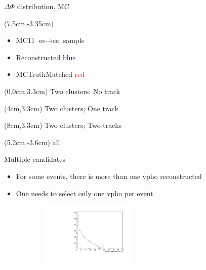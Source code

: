 \documentclass[10pt]{beamer}
\begin{document}
{\begin{frame}{$\Delta \Phi$ distribution, MC}
\begin{textblock*}{\textwidth}
\end{textblock*}	

\begin{textblock*}{\textwidth}(7.5cm,-3.35cm)
	\begin{itemize}
		\item MC11 $\textrm{ee} \rightarrow \textrm{ee}$ sample
		\item Reconstructed \textcolor{blue}{blue}
		\item MCTruthMatched \textcolor{red}{red}
	\end{itemize}
	
\end{textblock*}

\begin{textblock*}{0.2\textwidth}(0.0cm,3.3cm)
 Two clusters; No track
\end{textblock*}

\begin{textblock*}{0.2\textwidth}(4cm,3.3cm)
	Two clusters; One track
\end{textblock*}

\begin{textblock*}{0.2\textwidth}(8cm,3.3cm)
	Two clusters; Two tracks
\end{textblock*}


\begin{textblock*}{\textwidth}(5.2cm,-3.6cm)
	all
\end{textblock*}


\end{frame}



\begin{frame}{Multiple candidates}
	
	\begin{itemize}
		\item For some events, there is more than one vpho reconstructed
		\item One needs to select only one vpho per event
	\end{itemize}
	
	
	
		\begin{figure}
		\begin{subfigure}{.5\textwidth}
			\centering
			\includegraphics[width=4.5cm]{Plots/NumVpho}
			

\end{subfigure}
\end{figure}
\end{frame}}
\end{document}
